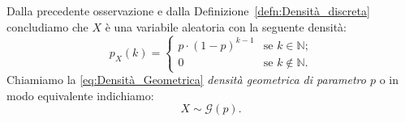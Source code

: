             \begin{defn}
                Dalla precedente osservazione e dalla Definizione~\ref{defn:Densità_discreta} concludiamo che $X$ è una variabile aleatoria con la seguente densità:
                \begin{equation}\label{eq:Densità_Geometrica}
                    p_X(k) = \begin{cases}
                        p \cdot (1-p)^{k-1} & \text{se $k \in \mathbb{N}$;} \\
                        0 & \text{se $k \notin \mathbb{N}$.}
                    \end{cases}
                \end{equation}
                Chiamiamo la \eqref{eq:Densità_Geometrica} \textit{densità geometrica di parametro $p$} o in modo equivalente indichiamo: \[
                    X \sim \mathcal{G}(p)
                .\] 
            \end{defn}
